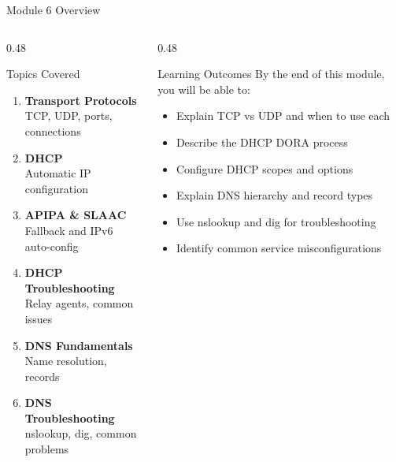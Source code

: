 \documentclass[aspectratio=169]{beamer}  %
\begin{document}
\begin{frame}{Module 6 Overview}
    \begin{columns}[T]
        \begin{column}{0.48\textwidth}
            \begin{block}{Topics Covered}
                \small
                \begin{enumerate}\setlength{\itemsep}{3pt}
                    \item \textbf{Transport Protocols} \\
                          {\scriptsize TCP, UDP, ports, connections}
                    \item \textbf{DHCP} \\
                          {\scriptsize Automatic IP configuration}
                    \item \textbf{APIPA \& SLAAC} \\
                          {\scriptsize Fallback and IPv6 auto-config}
                    \item \textbf{DHCP Troubleshooting} \\
                          {\scriptsize Relay agents, common issues}
                    \item \textbf{DNS Fundamentals} \\
                          {\scriptsize Name resolution, records}
                    \item \textbf{DNS Troubleshooting} \\
                          {\scriptsize nslookup, dig, common problems}
                \end{enumerate}
            \end{block}
        \end{column}
        \begin{column}{0.48\textwidth}
            \begin{block}{Learning Outcomes}
                \small
                By the end of this module, you will be able to:
                \begin{itemize}\setlength{\itemsep}{2pt}
                    \item Explain TCP vs UDP and when to use each
                    \item Describe the DHCP DORA process
                    \item Configure DHCP scopes and options
                    \item Explain DNS hierarchy and record types
                    \item Use nslookup and dig for troubleshooting
                    \item Identify common service misconfigurations
                \end{itemize}
            \end{block}
            

\end{column}
\end{columns}
\end{frame}
\end{document}
